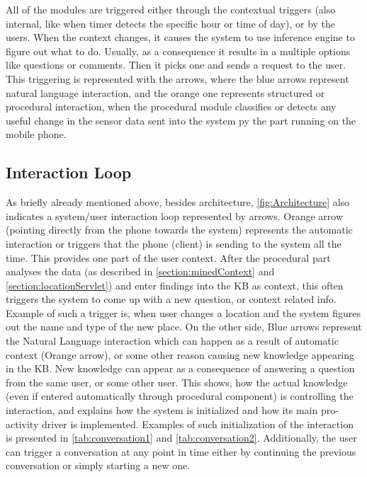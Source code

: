 All of the modules are triggered either through the contextual triggers 
(also internal, like when timer detects the specific hour or time of day), or
by the users. When the context changes, it causes the system to use inference
engine to figure out what to do. Usually, as a consequence it results in a 
multiple options like questions or comments. Then it picks one and sends a 
request to the user. This triggering is represented with the arrows, where the 
blue arrows represent natural language interaction, and the orange one
represents structured or procedural interaction, when the procedural module
classifies or detects any useful change in the sensor data sent into the system
py the part running on the mobile phone.

\subsection{Interaction Loop}
\label{section:interaction}
As briefly already mentioned above, besides architecture, 
\autoref{fig:Architecture} also indicates a system/user interaction loop 
represented by arrows. Orange arrow (pointing 
directly from the phone towards the system) represents the automatic interaction
or triggers that the phone (client) is sending to the system all the time. This
provides one part of the user context. After the procedural part analyses
the data (as described in \autoref{section:minedContext} and 
\autoref{section:locationServlet}) and enter findings into the KB as 
context, this often triggers the system to come up with a new question, or 
context related info. Example of such a trigger is, when user changes a location
and the system figures out the name and type of the new place. On the other 
side, Blue arrows represent the Natural Language interaction which can happen
as a result of automatic context (Orange arrow), or some other reason causing new 
knowledge appearing in the KB. New knowledge can appear as a consequence of
answering a question from the same user, or some other user. This shows, how the
actual knowledge (even if entered automatically through procedural component) is
controlling the interaction, and explains how the system is initialized and how
its main pro-activity driver is implemented. Examples of such initialization
of the interaction is presented in \autoref{tab:conversation1} and
\autoref{tab:conversation2}. Additionally, the 
user can trigger a conversation at any point in time either by continuing the 
previous conversation or simply starting a new one. 

